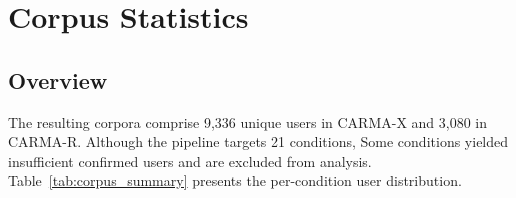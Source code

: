 \documentclass[11pt]{article}
\begin{document}
\section{Corpus Statistics}
\label{sec:corpus}



    
    
    




\subsection{Overview}
\label{subsec:corpus_overview}
The resulting corpora comprise 9,336 unique users in CARMA-X and 3,080 in CARMA-R. Although the pipeline targets 21 conditions, Some conditions yielded insufficient confirmed users and are excluded from analysis. Table~\ref{tab:corpus_summary} presents the per-condition user distribution. 
\end{document}
